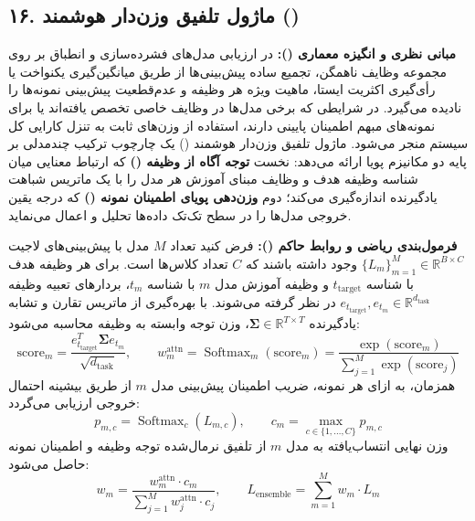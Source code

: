 \subsection*{۱۶. ماژول تلفیق وزن‌دار هوشمند  ()}

\textbf{مبانی نظری و انگیزه معماری ():}
در ارزیابی مدل‌های فشرده‌سازی و انطباق بر روی مجموعه وظایف ناهمگن، تجمیع ساده پیش‌بینی‌ها از طریق میانگین‌گیری یکنواخت یا رأی‌گیری اکثریت ایستا، ماهیت ویژه هر وظیفه و عدم‌قطعیت پیش‌بینی نمونه‌ها را نادیده می‌گیرد. در شرایطی که برخی مدل‌ها در وظایف خاصی تخصص یافته‌اند یا برای نمونه‌های مبهم اطمینان پایینی دارند، استفاده از وزن‌های ثابت به تنزل کارایی کل سیستم منجر می‌شود.
ماژول تلفیق وزن‌دار هوشمند () یک چارچوب ترکیب چندمدلی بر پایه دو مکانیزم پویا ارائه می‌دهد: نخست \textbf{توجه آگاه از وظیفه ()} که ارتباط معنایی میان شناسه وظیفه هدف و وظایف مبنای آموزش هر مدل را با یک ماتریس شباهت یادگیرنده اندازه‌گیری می‌کند؛ دوم \textbf{وزن‌دهی پویای اطمینان نمونه ()} که درجه یقین خروجی مدل‌ها را در سطح تک‌تک داده‌ها تحلیل و اعمال می‌نماید.

\textbf{فرمول‌بندی ریاضی و روابط حاکم ():}
فرض کنید تعداد $M$ مدل با پیش‌بینی‌های لاجیت $\{L_m\}_{m=1}^M \in \mathbb{R}^{B \times C}$ وجود داشته باشند که $C$ تعداد کلاس‌ها است. برای هر وظیفه هدف با شناسه $t_{\text{target}}$ و وظیفه آموزش مدل $m$ با شناسه $t_m$، بردارهای تعبیه وظیفه $e_{t_{\text{target}}}, e_{t_m} \in \mathbb{R}^{d_{\text{task}}}$ در نظر گرفته می‌شوند. با بهره‌گیری از ماتریس تقارن و تشابه یادگیرنده $\mathbf{\Sigma} \in \mathbb{R}^{T \times T}$، وزن توجه وابسته به وظیفه محاسبه می‌شود:
\begin{equation}
\text{score}_m = \frac{e_{t_{\text{target}}}^T \mathbf{\Sigma} e_{t_m}}{\sqrt{d_{\text{task}}}}, \qquad
w_m^{\text{attn}} = \operatorname{Softmax}_m(\text{score}_m) = \frac{\exp(\text{score}_m)}{\sum_{j=1}^M \exp(\text{score}_j)}
\end{equation}
همزمان، به ازای هر نمونه، ضریب اطمینان پیش‌بینی مدل $m$ از طریق بیشینه احتمال خروجی ارزیابی می‌گردد:
\begin{equation}
p_{m, c} = \operatorname{Softmax}_c(L_{m, c}), \qquad c_m = \max_{c \in \{1, \dots, C\}} p_{m, c}
\end{equation}
وزن نهایی انتساب‌یافته به مدل $m$ از تلفیق نرمال‌شده توجه وظیفه و اطمینان نمونه حاصل می‌شود:
\begin{equation}
w_m = \frac{w_m^{\text{attn}} \cdot c_m}{\sum_{j=1}^M w_j^{\text{attn}} \cdot c_j}, \qquad
L_{\text{ensemble}} = \sum_{m=1}^M w_m \cdot L_m
\end{equation}

